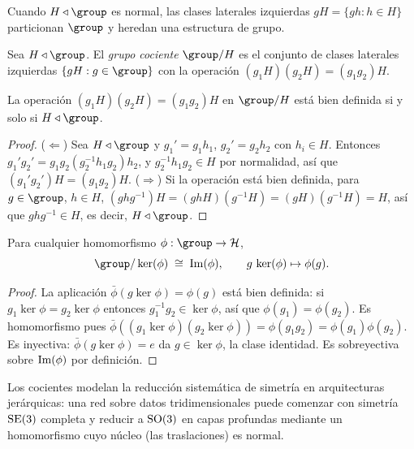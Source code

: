 Cuando $H \triangleleft \group$ es normal, las clases laterales izquierdas $gH =
\{gh : h \in H\}$ particionan $\group$ y heredan una estructura de grupo.

\begin{definition}
\label{def:found:quotient}
Sea $H \triangleleft \group$. El \emph{grupo cociente} $\group/H$ es el conjunto de
clases laterales izquierdas $\{gH : g \in \group\}$ con la operaci\'on
$(g_1 H)(g_2 H) = (g_1 g_2) H$.
\end{definition}

\begin{proposition}
\label{prop:found:quotient-welldef}
La operaci\'on $(g_1 H)(g_2 H) = (g_1 g_2)H$ en $\group/H$ est\'a bien definida si y
solo si $H \triangleleft \group$.
\end{proposition}

\begin{proof}
($\Leftarrow$) Sea $H \triangleleft \group$ y $g_1' = g_1 h_1$, $g_2' = g_2 h_2$
con $h_i \in H$. Entonces $g_1'g_2' = g_1 g_2 (g_2^{-1}h_1 g_2)h_2$, y
$g_2^{-1}h_1 g_2 \in H$ por normalidad, as\'i que $(g_1'g_2')H = (g_1 g_2)H$.
($\Rightarrow$) Si la operaci\'on est\'a bien definida, para $g \in \group$,
$h \in H$, $(ghg^{-1})H = (ghH)(g^{-1}H) = (gH)(g^{-1}H) = H$, as\'i que
$ghg^{-1} \in H$, es decir, $H \triangleleft \group$.
\end{proof}

\begin{theorem}
\label{thm:found:first-iso}
Para cualquier homomorfismo $\phi : \group \to \mathcal{H}$,
\[
  \group / \ker(\phi) \;\cong\; \Img(\phi), \qquad
  g\,\ker(\phi) \mapsto \phi(g).
\]
\end{theorem}

\begin{proof}
La aplicaci\'on $\bar\phi(g\ker\phi) = \phi(g)$ est\'a bien definida: si
$g_1\ker\phi = g_2\ker\phi$ entonces $g_1^{-1}g_2 \in \ker\phi$, as\'i que
$\phi(g_1) = \phi(g_2)$. Es homomorfismo pues $\bar\phi((g_1\ker\phi)(g_2\ker\phi))
= \phi(g_1 g_2) = \phi(g_1)\phi(g_2)$. Es inyectiva: $\bar\phi(g\ker\phi) = e$ da
$g \in \ker\phi$, la clase identidad. Es sobreyectiva sobre $\operatorname{Im}(\phi)$ por
definici\'on.
\end{proof}

Los cocientes modelan la reducci\'on sistem\'atica de simetr\'ia en arquitecturas
jer\'arquicas: una red sobre datos tridimensionales puede comenzar con simetr\'ia
$\operatorname{SE}(3)$ completa y reducir a $\operatorname{SO}(3)$ en capas profundas mediante un homomorfismo
cuyo n\'ucleo (las traslaciones) es normal.

